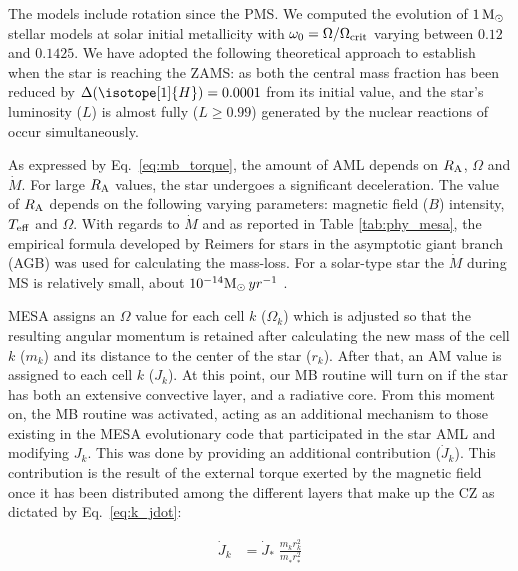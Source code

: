 \documentclass[fleqn,usenatbib]{mnras}
\begin{document}
The models include rotation since the PMS. We computed the evolution of $1\,\mathrm{M}_\odot$ stellar models at solar initial metallicity with $\omega_{\mathrm{0}} = \Omega / \Omega_{\mathrm{crit}}$ varying between $0.12$ and $0.1425$. We have adopted the following theoretical approach to establish when the star is reaching the ZAMS: as both the central  mass fraction has been reduced by $\Delta( \isotope[1]{H})= 0.0001$ from its initial value, and the star's luminosity ($L$) is almost fully ($L \geq 0.99$) generated by the nuclear reactions of  occur simultaneously.\par

As expressed by Eq.~\ref{eq:mb_torque}, the amount of AML depends on $R_{\mathrm{A}}$, $\Omega$ and $\Dot{M}$. For large $R_{\mathrm{A}}$ values, the star undergoes a significant deceleration. The value of $R_{\mathrm{A}}$ depends on the following varying parameters: magnetic field ($B$) intensity, $T_{\mathrm{eff}}$ and $\Omega$. With regards to $\Dot{M}$ and as reported in Table \ref{tab:phy_mesa}, the empirical formula developed by Reimers \citep{Reimers1975} for stars in the asymptotic giant branch (AGB) was used for calculating the mass-loss. For a solar-type star the $\Dot{M}$ during MS is relatively small, about  $10^{-14}\mathrm{M}_\odot \, yr^{-1}$ \citep{Noerdlinger2008}. \par

MESA assigns an $\Omega$ value for each cell $k$ ($\Omega_k$) which is adjusted so that the resulting angular momentum is retained after calculating the new mass of the cell $k$ ($m_k$) and its distance to the center of the star ($r_k$). After that, an AM value is assigned to each cell $k$ ($J_k$). At this point, our MB routine will turn on if the star has both an extensive convective layer, and a radiative core. From this moment on, the MB routine was activated, acting as an additional mechanism to those existing in the MESA evolutionary code that participated in the star AML and modifying $J_k$. This was done by providing an additional contribution ($\Dot{J}_{k}$). This contribution is the result of the external torque exerted by the magnetic field once it has been distributed among the different layers that make up the CZ as dictated by Eq.~\ref{eq:k_jdot}:\par

\begin{ceqn}
\begin{align}
    \Dot{J}_{k} &= \Dot{J}_*\;\frac{m^{}_{k} r^2_{k}}{m^{}_* r_*^2} \label{eq:k_jdot}
\end{align}
\end{ceqn}
\end{document}
